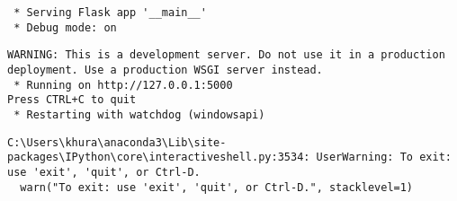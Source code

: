 \documentclass[
  letterpaper,
  DIV=11,
  numbers=noendperiod]{scrreprt}
\begin{document}
\begin{verbatim}
 * Serving Flask app '__main__'
 * Debug mode: on
\end{verbatim}

\begin{verbatim}
WARNING: This is a development server. Do not use it in a production deployment. Use a production WSGI server instead.
 * Running on http://127.0.0.1:5000
Press CTRL+C to quit
 * Restarting with watchdog (windowsapi)
\end{verbatim}


\begin{verbatim}
C:\Users\khura\anaconda3\Lib\site-packages\IPython\core\interactiveshell.py:3534: UserWarning: To exit: use 'exit', 'quit', or Ctrl-D.
  warn("To exit: use 'exit', 'quit', or Ctrl-D.", stacklevel=1)
\end{verbatim}
\end{document}
